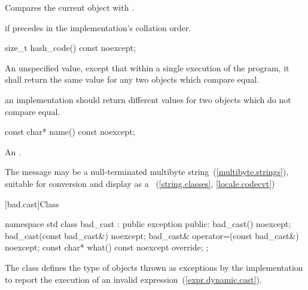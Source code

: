 \begin{itemdescr}
\pnum
\effects
Compares the current object with .

\pnum
\returns
{}
if
precedes  in the implementation's collation order.
\end{itemdescr}

%
\begin{itemdecl}
size_t hash_code() const noexcept;
\end{itemdecl}

\begin{itemdescr}
\pnum
\returns An unspecified value, except that within a single execution of the
program, it shall return the same value for any two 
objects which compare equal.

\pnum
\remark an implementation should return different values for two
 objects which do not compare equal.
\end{itemdescr}


%
%
\begin{itemdecl}
const char* name() const noexcept;
\end{itemdecl}

\begin{itemdescr}
\pnum
\returns
An  \ntbs.

\pnum
\remarks
The message may be a null-terminated multibyte string~(\ref{multibyte.strings}),
suitable for conversion and display as a
~(\ref{string.classes}, \ref{locale.codecvt})
\end{itemdescr}

[bad.cast]{Class }

%
\begin{codeblock}
namespace std {
  class bad_cast : public exception {
  public:
    bad_cast() noexcept;
    bad_cast(const bad_cast&) noexcept;
    bad_cast& operator=(const bad_cast&) noexcept;
    const char* what() const noexcept override;
  };
}
\end{codeblock}

\pnum
The class
defines the type of objects thrown
as exceptions by the implementation to report the execution of an invalid
%
expression~(\ref{expr.dynamic.cast}).

